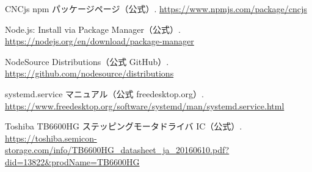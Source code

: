 \documentclass[uplatex,dvipdfmx]{ujarticle}
\begin{document}
\begin{thebibliography}{999}
CNCjs npm パッケージページ（公式）.  
\url{https://www.npmjs.com/package/cncjs}

Node.js: Install via Package Manager（公式）.  
\url{https://nodejs.org/en/download/package-manager}

NodeSource Distributions（公式 GitHub）.  
\url{https://github.com/nodesource/distributions}


systemd.service マニュアル（公式 freedesktop.org）.  
\url{https://www.freedesktop.org/software/systemd/man/systemd.service.html}

Toshiba TB6600HG ステッピングモータドライバ IC（公式）.  
\url{https://toshiba.semicon-storage.com/info/TB6600HG_datasheet_ja_20160610.pdf?did=13822&prodName=TB6600HG}

\end{thebibliography}
\end{document}
